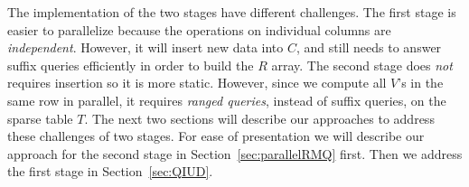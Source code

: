 The implementation of the two stages have different challenges.  The
first stage is easier to parallelize because the operations on
individual columns are {\em independent}.  However, it will insert new
data into $C$, and still needs to answer suffix queries efficiently in
order to build the $R$ array.  The second stage does {\em not}
requires insertion so it is more static.  However, since we compute
all $V$'s in the same row in parallel, it requires {\em ranged
  queries}, instead of suffix queries, on the sparse table $T$.  The
next two sections will describe our approaches to address these
challenges of two stages.  For ease of presentation we will describe
our approach for the second stage in Section~\ref{sec:parallelRMQ}
first.  Then we address the first stage in Section~\ref{sec:QIUD}.
